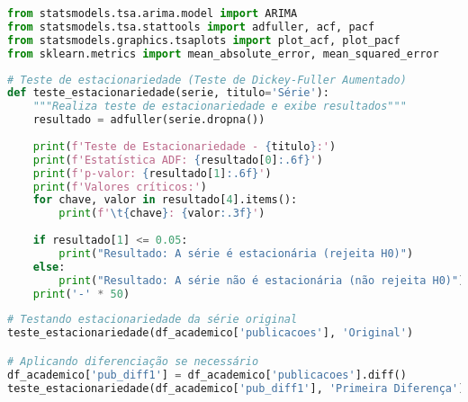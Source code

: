 \begin{pythonbox}
\begin{lstlisting}[language=Python]
from statsmodels.tsa.arima.model import ARIMA
from statsmodels.tsa.stattools import adfuller, acf, pacf
from statsmodels.graphics.tsaplots import plot_acf, plot_pacf
from sklearn.metrics import mean_absolute_error, mean_squared_error
\end{lstlisting}
\end{pythonbox}

\begin{pythonbox}
\begin{lstlisting}[language=Python]
# Teste de estacionariedade (Teste de Dickey-Fuller Aumentado)
def teste_estacionariedade(serie, titulo='Série'):
    """Realiza teste de estacionariedade e exibe resultados"""
    resultado = adfuller(serie.dropna())
    
    print(f'Teste de Estacionariedade - {titulo}:')
    print(f'Estatística ADF: {resultado[0]:.6f}')
    print(f'p-valor: {resultado[1]:.6f}')
    print(f'Valores críticos:')
    for chave, valor in resultado[4].items():
        print(f'\t{chave}: {valor:.3f}')
    
    if resultado[1] <= 0.05:
        print("Resultado: A série é estacionária (rejeita H0)")
    else:
        print("Resultado: A série não é estacionária (não rejeita H0)")
    print('-' * 50)
\end{lstlisting}
\end{pythonbox}

\begin{pythonbox}
\begin{lstlisting}[language=Python]
# Testando estacionariedade da série original
teste_estacionariedade(df_academico['publicacoes'], 'Original')

# Aplicando diferenciação se necessário
df_academico['pub_diff1'] = df_academico['publicacoes'].diff()
teste_estacionariedade(df_academico['pub_diff1'], 'Primeira Diferença')
\end{lstlisting}
\end{pythonbox}

